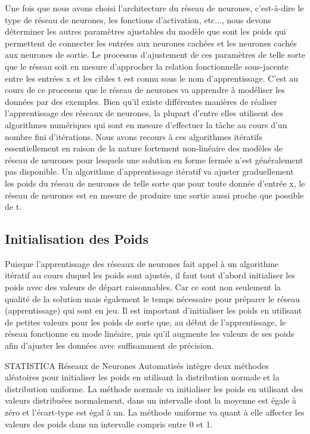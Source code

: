 \documentclass[11pt]{report}
\begin{document}
Une fois que nous avons choisi l'architecture du réseau de neurones, c'est-à-dire le type de réseau de neurones, les fonctions d'activation, etc..., nous devons déterminer les autres paramètres ajustables du modèle que sont les poids qui permettent de connecter les entrées aux neurones cachées et les neurones cachés aux neurones de sortie. Le processus d'ajustement de ces paramètres de telle sorte que le réseau soit en mesure d'approcher la relation fonctionnelle sous-jacente entre les entrées x et les cibles t est connu sous le nom d'apprentissage. C'est au cours de ce processus que le réseau de neurones va apprendre à modéliser les données par des exemples. Bien qu'il existe différentes manières de réaliser l'apprentissage des réseaux de neurones, la plupart d'entre elles utilisent des algorithmes numériques qui sont en mesure d'effectuer la tâche au cours d'un nombre fini d'itérations. Nous avons recours à ces algorithmes itératifs essentiellement en raison de la nature fortement non-linéaire des modèles de réseau de neurones pour lesquels une solution en forme fermée n'est généralement pas disponible. Un algorithme d'apprentissage itératif va ajuster graduellement les poids du réseau de neurones de telle sorte que pour toute donnée d'entrée x, le réseau de neurones est en mesure de produire une sortie aussi proche que possible de t.

\subsection{Initialisation des Poids}
Puisque l'apprentissage des réseaux de neurones fait appel à un algorithme itératif au cours duquel les poids sont ajustés, il faut tout d'abord initialiser les poids avec des valeurs de départ raisonnables. Car ce sont non seulement la qualité de la solution mais également le temps nécessaire pour préparer le réseau (apprentissage) qui sont en jeu. Il est important d'initialiser les poids en utilisant de petites valeurs pour les poids de sorte que, au début de l'apprentissage, le réseau fonctionne en mode linéaire, puis qu'il augmente les valeurs de ses poids afin d'ajuster les données avec suffisamment de précision.

STATISTICA Réseaux de Neurones Automatisés intègre deux méthodes aléatoires pour initialiser les poids en utilisant la distribution normale et la distribution uniforme. La méthode normale va initialiser les poids en utilisant des valeurs distribuées normalement, dans un intervalle dont la moyenne est égale à zéro et l'écart-type est égal à un. La méthode uniforme va quant à elle affecter les valeurs des poids dans un intervalle compris entre 0 et 1.
\end{document}

